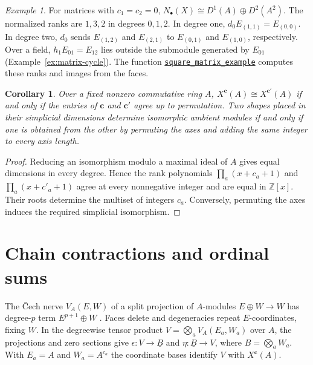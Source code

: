 \documentclass[11pt]{article}
\newtheorem{corollary}[theorem]{Corollary}
\theoremstyle{definition}
\theoremstyle{remark}
\newtheorem{example}[theorem]{Example}
\newcommand{\program}[2]{\href{https://github.com/flengyel/SimplicialTensors/blob/c6802c6692215b688864dc18cd9ff3073b804d71/#1}{\nolinkurl{#2}}}
\begin{document}
\begin{example}
For matrices with $c_1=c_2=0$,
$N_\bullet(X)\cong D^1(A)\oplus D^2(A^2)$.
The normalized ranks are $1,3,2$ in degrees $0,1,2$. In degree one,
$d_0E_{(1,1)}=E_{(0,0)}$. In degree two, $d_0$ sends $E_{(1,2)}$
and $E_{(2,1)}$ to $E_{(0,1)}$ and $E_{(1,0)}$, respectively.
Over a field, $h_1E_{01}=E_{12}$ lies outside the submodule generated
by $E_{01}$ (Example~\ref{ex:matrix-cycle}).
The function \program{tex/anc/dstm_examples.py\#L164}{square_matrix_example} computes these ranks and images from the faces.
\end{example}

\begin{corollary}\label{cor:shape}
Over a fixed nonzero commutative ring $A$, $X^{\mathbf c}(A)\cong X^{\mathbf c'}(A)$
if and only if the entries of $\mathbf c$ and $\mathbf c'$ agree up to permutation.
Two shapes placed in their simplicial dimensions determine isomorphic
ambient modules if and only if one is obtained from the other by permuting
the axes and adding the same integer to every axis length.
\end{corollary}
\begin{proof}
Reducing an isomorphism modulo a maximal ideal of $A$ gives equal
dimensions in every degree. Hence the rank polynomials
$\prod_a(x+c_a+1)$ and $\prod_a(x+c'_a+1)$ agree at every nonnegative
integer and are equal in $\mathbb Z[x]$. Their roots determine the
multiset of integers $c_a$. Conversely, permuting the axes induces
the required simplicial isomorphism.
\end{proof}

\section{Chain contractions and ordinal sums}\label{sec:contractions}
The \v{C}ech nerve $V_A(E,W)$ of a split projection of $A$-modules
$E\oplus W\to W$ has degree-$p$ term $E^{p+1}\oplus W$
\cite[Tag 019P]{StacksCech}. Faces delete and degeneracies repeat
$E$-coordinates, fixing $W$. In the degreewise tensor product
$V=\bigotimes_a V_A(E_a,W_a)$ over $A$, the projections and zero sections give
$\epsilon:V\to\underline B$ and $\eta:\underline B\to V$, where
$B=\bigotimes_a W_a$. With $E_a=A$ and $W_a=A^{c_a}$ the coordinate
bases identify $V$ with $X^{\mathbf c}(A)$.
\end{document}
